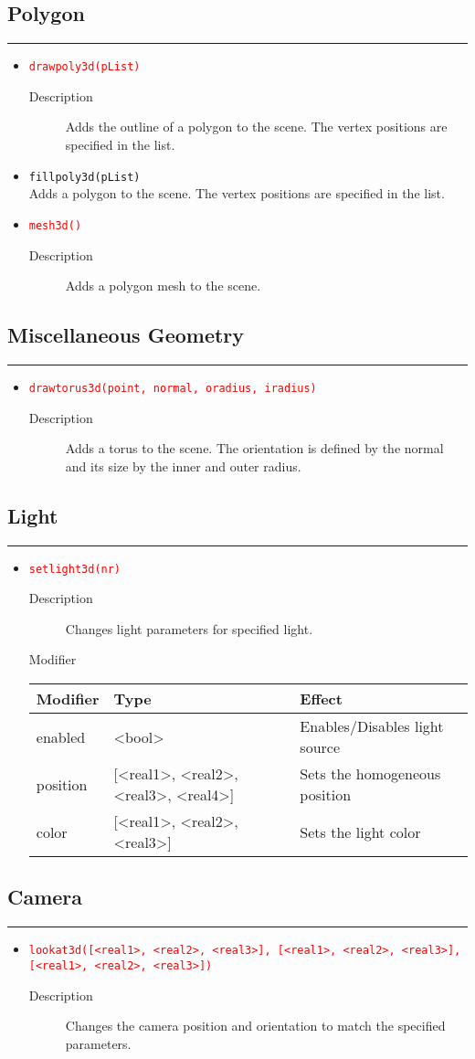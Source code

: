 \documentclass[10pt,a4widepaper]{scrartcl}
\newcommand{\csubsection}[1]{\subsection*{#1}\vspace{-0.55cm}\textcolor{CBlue}{\rule[1ex]{\textwidth}{0.4pt}}}
\begin{document}
\csubsection{Polygon}
\begin{itemize}
\item \textcolor{red}{\texttt{drawpoly3d(pList)}}
\begin{description}
\item[Description] Adds the outline of a polygon to the scene. The vertex positions are specified in the list.
\end{description}

\item \textcolor{CBlue}{\texttt{fillpoly3d(pList)}}\\[1ex]
Adds a polygon to the scene. The vertex positions are specified in the list.

\item \textcolor{red}{\texttt{mesh3d()}}
\begin{description}
\item[Description] Adds a polygon mesh to the scene.
\end{description}
\end{itemize}

\csubsection{Miscellaneous Geometry}
\begin{itemize}
\item \textcolor{red}{\texttt{drawtorus3d(point, normal, oradius, iradius)}}
\begin{description}
\item[Description] Adds a torus to the scene. The orientation is defined by the normal and its size by the inner and outer radius.
\end{description}
\end{itemize}

\csubsection{Light}
\begin{itemize}
\item \textcolor{red}{\texttt{setlight3d(nr)}}
\begin{description}
\item[Description] Changes light parameters for specified light.
\item[Modifier]
\end{description}
\begin{center}
\begin{tabular}{l|l|l}
Modifier & Type & Effect \\ 
\hline enabled & <bool> & Enables/Disables light source\\
\hline position & [<real1>, <real2>, <real3>, <real4>] & Sets the homogeneous position \\ 
\hline color & [<real1>, <real2>, <real3>] & Sets the light color
\end{tabular}
\end{center}
\end{itemize}

\csubsection{Camera}
\begin{itemize}
\item \textcolor{red}{\texttt{lookat3d([<real1>, <real2>, <real3>], [<real1>, <real2>, <real3>], [<real1>, <real2>, <real3>])}}
\begin{description}
\item[Description] Changes the camera position and orientation to match the specified parameters.
\end{description}
\end{itemize}
\end{document}
